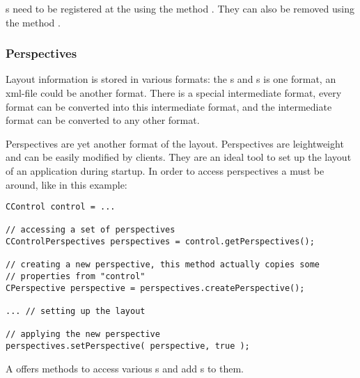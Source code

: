 s need to be registered at the  using the method . They can also be removed using the method . 



\subsubsection{Perspectives}
Layout information is stored in various formats: the s and \linebreak {}s is one format, an xml-file could be another format. There is a special intermediate format, every format can be converted into this intermediate format, and the intermediate format can be converted to any other format.

Perspectives are yet another format of the layout. Perspectives are \linebreak leightweight and can be easily modified by clients. They are an ideal tool to set up the layout of an application during startup. In order to access perspectives a  must be around, like in this example:
\begin{lstlisting}
CControl control = ...

// accessing a set of perspectives
CControlPerspectives perspectives = control.getPerspectives();

// creating a new perspective, this method actually copies some 
// properties from "control"
CPerspective perspective = perspectives.createPerspective();

... // setting up the layout

// applying the new perspective
perspectives.setPerspective( perspective, true );
\end{lstlisting}

A  offers methods to access various s and add s to them.


